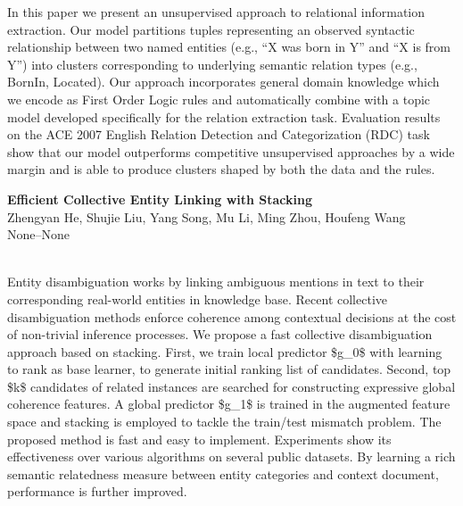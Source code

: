 \documentclass[twoside,makeidx]{book}
\begin{document}
\nopagebreak%
\noindent%
{\small In this paper we present an unsupervised approach to relational information extraction. Our model partitions tuples representing an observed syntactic relationship between two named entities (e.g., ``X was born in Y'' and ``X is from Y'') into clusters corresponding to underlying semantic relation types (e.g., BornIn, Located). Our approach incorporates general domain knowledge which we encode as First Order Logic rules and automatically combine with a topic model developed specifically for the relation extraction task. Evaluation results on the ACE 2007 English Relation Detection and Categorization (RDC) task show that our model outperforms competitive unsupervised approaches by a wide margin and is able to produce clusters shaped by both the data and the rules.}
\par\vspace{2em}\noindent%
\begin{minipage}{\linewidth}%
\begin{center}
\textbf{\normalsize Efficient Collective Entity Linking with Stacking}\\
\normalsize  Zhengyan He,  Shujie Liu,  Yang Song,  Mu Li,  Ming Zhou,  Houfeng Wang\\
{\small None--None}\\
\end{center}
\end{minipage}\\[0.5em]
\nopagebreak%
\noindent%
{\small Entity disambiguation works by linking ambiguous mentions in text to their   corresponding real-world entities in knowledge base. Recent collective   disambiguation methods enforce coherence among contextual decisions at the   cost of non-trivial inference processes. We propose a fast collective   disambiguation approach based on stacking. First, we train local predictor   \$g\_0\$ with learning to rank as base learner, to generate initial ranking list   of candidates. Second, top \$k\$ candidates of related instances are searched   for constructing expressive global coherence features. A global predictor   \$g\_1\$ is trained in the augmented feature space and stacking is employed to   tackle the train/test mismatch problem.   The proposed method is fast and easy to implement. Experiments show its   effectiveness over various algorithms on several public datasets. By learning   a rich semantic relatedness measure between entity categories and context   document, performance is further improved.}
\par\vspace{2em}\noindent%
\end{document}
